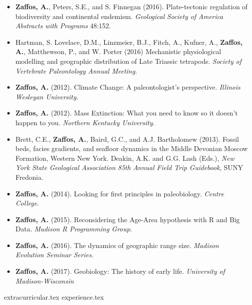 \documentclass[12pt, a4paper]{awesome-cv}
\newcommand*{\sectiondir}{resume/}
\begin{document}
\begin{itemize}[leftmargin=*]
\item{\textbf{Zaffos, A.}, Peters, S.E., and S. Finnegan (2016). Plate-tectonic regulation of biodiversity and continental endemism. \textit{Geological Society of America Abstracts with Programs} 48:152.}
\item{Hartman, S. Lovelace, D.M., Linzmeier, B.J., Fitch, A., Kufner, A., \textbf{Zaffos, A.}, Matthewson, P., and W. Porter (2016) Mechanistic physiological modelling and geographic distribution of Late Triassic tetrapods. \textit{Society of Vertebrate Paleontology Annual Meeting}.}
\end{itemize}

\fontsize{10pt}{1em}\bodyfontlight\upshape\color{text}
\begin{itemize}[leftmargin=*]
\item{\textbf{Zaffos, A.} (2012). Climate Change: A paleontologist's perspective. \textit{Illinois Wesleyan University}.}
\item{\textbf{Zaffos, A.} (2012). Mass Extinction: What you need to know so it doesn't happen to you. \textit{Northern Kentucky University}.}
\item{Brett, C.E., \textbf{Zaffos, A.}, Baird, G.C., and A.J. Bartholomew (2013). Fossil beds, facies gradients, and seafloor dynamics in the Middle Devonian Moscow Formation, Western New York. Deakin, A.K. and G.G. Lash (Eds.), \textit{New York State Geological Association 85th Annual Field Trip Guidebook}, SUNY Fredonia.}
\item{\textbf{Zaffos, A.} (2014). Looking for first principles in paleobiology. \textit{Centre College}.}
\item{\textbf{Zaffos, A.} (2015). Reconsidering the Age-Area hypothesis with R and Big Data. \textit{Madison R Programming Group}.}
\item{\textbf{Zaffos, A.} (2016). The dynamics of geographic range size. \textit{Madison Evolution Seminar Series}.}
\item{\textbf{Zaffos, A.} (2017). Geobiology: The history of early life. \textit{University of Madison-Wisconsin}}
\end{itemize}

{extracurricular.tex}
\vspace{-20pt}
{experience.tex}
\vspace{-20pt}
\end{document}
